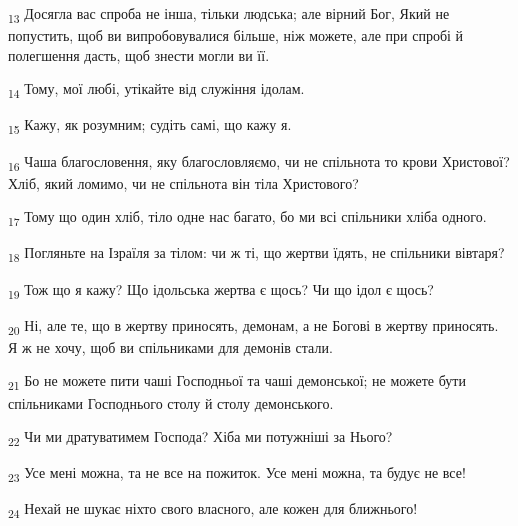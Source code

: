 \begin{tcolorbox}
\textsubscript{13} Досягла вас спроба не інша, тільки людська; але вірний Бог, Який не попустить, щоб ви випробовувалися більше, ніж можете, але при спробі й полегшення дасть, щоб знести могли ви її.
\end{tcolorbox}
\begin{tcolorbox}
\textsubscript{14} Тому, мої любі, утікайте від служіння ідолам.
\end{tcolorbox}
\begin{tcolorbox}
\textsubscript{15} Кажу, як розумним; судіть самі, що кажу я.
\end{tcolorbox}
\begin{tcolorbox}
\textsubscript{16} Чаша благословення, яку благословляємо, чи не спільнота то крови Христової? Хліб, який ломимо, чи не спільнота він тіла Христового?
\end{tcolorbox}
\begin{tcolorbox}
\textsubscript{17} Тому що один хліб, тіло одне нас багато, бо ми всі спільники хліба одного.
\end{tcolorbox}
\begin{tcolorbox}
\textsubscript{18} Погляньте на Ізраїля за тілом: чи ж ті, що жертви їдять, не спільники вівтаря?
\end{tcolorbox}
\begin{tcolorbox}
\textsubscript{19} Тож що я кажу? Що ідольська жертва є щось? Чи що ідол є щось?
\end{tcolorbox}
\begin{tcolorbox}
\textsubscript{20} Ні, але те, що в жертву приносять, демонам, а не Богові в жертву приносять. Я ж не хочу, щоб ви спільниками для демонів стали.
\end{tcolorbox}
\begin{tcolorbox}
\textsubscript{21} Бо не можете пити чаші Господньої та чаші демонської; не можете бути спільниками Господнього столу й столу демонського.
\end{tcolorbox}
\begin{tcolorbox}
\textsubscript{22} Чи ми дратуватимем Господа? Хіба ми потужніші за Нього?
\end{tcolorbox}
\begin{tcolorbox}
\textsubscript{23} Усе мені можна, та не все на пожиток. Усе мені можна, та будує не все!
\end{tcolorbox}
\begin{tcolorbox}
\textsubscript{24} Нехай не шукає ніхто свого власного, але кожен для ближнього!
\end{tcolorbox}
